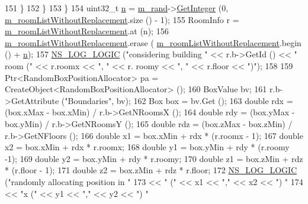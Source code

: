 \begin{DoxyCode}
151             \}
152         \}
153     \}
154   uint32\_t \hyperlink{namespacesample-rng-plot_aeb5ee5c431e338ef39b7ac5431242e1d}{n} = \hyperlink{classns3_1_1RandomRoomPositionAllocator_ab516197adcf737e85bed980ecdeec062}{m\_rand}->\hyperlink{classns3_1_1RandomVariableStream_a66cd94e6305ce7f000f1a9ff0fcb9aef}{GetInteger} (0,
      \hyperlink{classns3_1_1RandomRoomPositionAllocator_a61c7c59ae97a661cda08996305d9e1c6}{m\_roomListWithoutReplacement}.size () - 1);
155   RoomInfo r = \hyperlink{classns3_1_1RandomRoomPositionAllocator_a61c7c59ae97a661cda08996305d9e1c6}{m\_roomListWithoutReplacement}.at (n);
156   \hyperlink{classns3_1_1RandomRoomPositionAllocator_a61c7c59ae97a661cda08996305d9e1c6}{m\_roomListWithoutReplacement}.erase (
      \hyperlink{classns3_1_1RandomRoomPositionAllocator_a61c7c59ae97a661cda08996305d9e1c6}{m\_roomListWithoutReplacement}.begin () + \hyperlink{namespacesample-rng-plot_aeb5ee5c431e338ef39b7ac5431242e1d}{n});
157   \hyperlink{group__logging_ga88acd260151caf2db9c0fc84997f45ce}{NS\_LOG\_LOGIC} (\textcolor{stringliteral}{"considering building "} << r.b->GetId () << \textcolor{stringliteral}{" room ("} << r.roomx << \textcolor{stringliteral}{", "} << r.
      roomy << \textcolor{stringliteral}{", "} << r.floor << \textcolor{stringliteral}{")"});
158 
159   Ptr<RandomBoxPositionAllocator> pa = CreateObject<RandomBoxPositionAllocator> ();
160   BoxValue bv;
161   r.b->GetAttribute (\textcolor{stringliteral}{"Boundaries"}, bv);
162   Box box = bv.Get ();
163   \textcolor{keywordtype}{double} rdx =  (box.xMax - box.xMin) / r.b->GetNRoomsX ();
164   \textcolor{keywordtype}{double} rdy =  (box.yMax - box.yMin) / r.b->GetNRoomsY ();
165   \textcolor{keywordtype}{double} rdz =  (box.zMax - box.zMin) / r.b->GetNFloors ();
166   \textcolor{keywordtype}{double} x1 = box.xMin + rdx * (r.roomx - 1);
167   \textcolor{keywordtype}{double} x2 = box.xMin + rdx * r.roomx;
168   \textcolor{keywordtype}{double} y1 = box.yMin + rdy * (r.roomy -1);
169   \textcolor{keywordtype}{double} y2 = box.yMin + rdy * r.roomy;
170   \textcolor{keywordtype}{double} z1 = box.zMin + rdz * (r.floor - 1);
171   \textcolor{keywordtype}{double} z2 = box.zMin + rdz * r.floor;
172   \hyperlink{group__logging_ga88acd260151caf2db9c0fc84997f45ce}{NS\_LOG\_LOGIC} (\textcolor{stringliteral}{"randomly allocating position in "}
173                 << \textcolor{stringliteral}{" ("} << x1 << \textcolor{stringliteral}{","} << x2 << \textcolor{stringliteral}{") "}
174                 << \textcolor{stringliteral}{"x ("} << y1 << \textcolor{stringliteral}{","} << y2 << \textcolor{stringliteral}{") "}

\end{DoxyCode}

